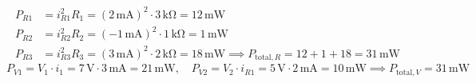\begin{ejercicio}
\begin{enumerate}
\begin{align*}
        P_{R1} &= i_{R1}^2 R_1 = (2\,\si{\milli\ampere})^2 \cdot 3\,\si{\kilo\ohm} = 12\,\si{\milli\watt} \\
        P_{R2} &= i_{R2}^2 R_2 = (-1\,\si{\milli\ampere})^2 \cdot 1\,\si{\kilo\ohm} = 1\,\si{\milli\watt} \\
        P_{R3} &= i_{R3}^2 R_3 = (3\,\si{\milli\ampere})^2 \cdot 2\,\si{\kilo\ohm} = 18\,\si{\milli\watt} \implies P_{\text{total},R} = 12 + 1 + 18 = \boxed{31\,\si{\milli\watt}}
    \end{align*}
    \begin{equation*}
        P_{V1} = V_1 \cdot i_1 = 7\,\si{\volt} \cdot 3\,\si{\milli\ampere} = 21\,\si{\milli\watt}, \quad P_{V2} = V_2 \cdot i_{R1} = 5\,\si{\volt} \cdot 2\,\si{\milli\ampere} = 10\,\si{\milli\watt} \implies P_{\text{total},V} = \boxed{31\,\si{\milli\watt}}
    \end{equation*}
\end{enumerate}
\end{ejercicio}

